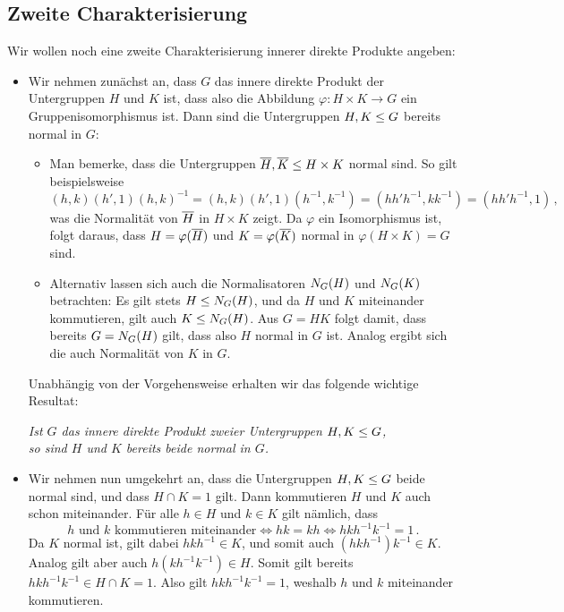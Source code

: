 \subsection*{Zweite Charakterisierung}

Wir wollen noch eine zweite Charakterisierung innerer direkte Produkte angeben:

\begin{itemize}
  \item
    Wir nehmen zunächst an, dass $G$ das innere direkte Produkt der Untergruppen $H$ und $K$ ist, dass also die Abbildung $\varphi \colon H \times K \to G$ ein Gruppenisomorphismus ist.
    Dann sind die Untergruppen $H, K \subgroup G$ bereits normal in $G$:
    
    \begin{itemize}
      \item
        Man bemerke, dass die Untergruppen $\induced{H}, \induced{K} \subgroup H \times K$ normal sind.
        So gilt beispielsweise
        \[
              (h, k) (h', 1) (h, k)^{-1}
          =   (h, k) (h', 1) (h^{-1}, k^{-1})
          =   (h h' h^{-1}, k k^{-1})
          =   (h h' h^{-1}, 1) \,,
        \]
        was die Normalität von $\induced{H}$ in $H \times K$ zeigt.
        Da $\varphi$ ein Isomorphismus ist, folgt daraus, dass $H = \varphi(\induced{H})$ und $K = \varphi(\induced{K})$ normal in $\varphi(H \times K) = G$ sind.
      \item
        Alternativ lassen sich auch die Normalisatoren $\normalizer{H}{G}$ und $\normalizer{K}{G}$ betrachten:
        Es gilt stets $H \subgroup \normalizer{H}{G}$, und da $H$ und $K$ miteinander kommutieren, gilt auch $K \subgroup \normalizer{H}{G}$.
        Aus $G = HK$ folgt damit, dass bereits $G = \normalizer{H}{G}$ gilt, dass also $H$ normal in $G$ ist.
        Analog ergibt sich die auch Normalität von $K$ in $G$.
    \end{itemize}
    
    Unabhängig von der Vorgehensweise erhalten wir das folgende wichtige Resultat:
    \begin{center}
      \emph{
      Ist $G$ das innere direkte Produkt zweier Untergruppen $H, K \subgroup G$,\\
      so sind $H$ und $K$ bereits beide normal in $G$.
      }
    \end{center}
  \item
    Wir nehmen nun umgekehrt an, dass die Untergruppen $H, K \subgroup G$ beide normal sind, und dass $H \cap K = 1$ gilt.
    Dann kommutieren $H$ und $K$ auch schon miteinander.
    Für alle $h \in H$ und $k \in K$ gilt nämlich, dass
    \[
            \text{$h$ und $k$ kommutieren miteinander}
      \iff  hk = kh
      \iff  h k h^{-1} k^{-1} = 1 \,.
    \]
    Da $K$ normal ist, gilt dabei $h k h^{-1} \in K$, und somit auch $(h k h^{-1}) k^{-1} \in K$.
    Analog gilt aber auch $h (k h^{-1} k^{-1}) \in H$.
    Somit gilt bereits $h k h^{-1} k^{-1} \in H \cap K = 1$.
    Also gilt $h k h^{-1} k^{-1} = 1$, weshalb $h$ und $k$ miteinander kommutieren.
\end{itemize}

